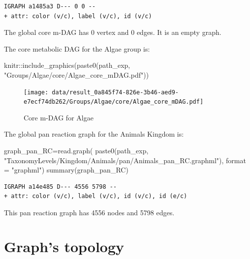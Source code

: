 \documentclass[
  letterpaper,
  DIV=11,
  numbers=noendperiod]{scrreprt}
\newenvironment{Shaded}{}{}
\newcommand{\AttributeTok}[1]{\textcolor[rgb]{0.78,0.47,0.87}{#1}}
\newcommand{\FunctionTok}[1]{\textcolor[rgb]{0.38,0.69,0.94}{#1}}
\newcommand{\NormalTok}[1]{\textcolor[rgb]{0.67,0.70,0.75}{#1}}
\newcommand{\OtherTok}[1]{\textcolor[rgb]{0.15,0.68,0.38}{#1}}
\newcommand{\SpecialCharTok}[1]{\textcolor[rgb]{0.34,0.71,0.76}{#1}}
\newcommand{\StringTok}[1]{\textcolor[rgb]{0.60,0.76,0.47}{#1}}
\begin{document}
\begin{verbatim}
IGRAPH a1485a3 D--- 0 0 -- 
+ attr: color (v/c), label (v/c), id (v/c)
\end{verbatim}

The global core m-DAG has 0 vertex and 0 edges. It is an empty graph.

The core metabolic DAG for the Algae group is:

\begin{Shaded}
\begin{Highlighting}[]
\NormalTok{knitr}\SpecialCharTok{::}\FunctionTok{include\_graphics}\NormalTok{(}\FunctionTok{paste0}\NormalTok{(path\_exp,                              }\StringTok{"Groups/Algae/core/Algae\_core\_mDAG.pdf"}\NormalTok{))}
\end{Highlighting}
\end{Shaded}

\begin{figure}[H]

{\centering \texttt{[image: data/result\_0a845f74-826e-3b46-aed9-e7ecf74db262/Groups/Algae/core/Algae\_core\_mDAG.pdf]}

}

\caption{Core m-DAG for Algae}

\end{figure}

The global pan reaction graph for the Animals Kingdom is:

\begin{Shaded}
\begin{Highlighting}[]
\NormalTok{graph\_pan\_RC}\OtherTok{=}\FunctionTok{read.graph}\NormalTok{(}
  \FunctionTok{paste0}\NormalTok{(path\_exp,}
         \StringTok{"TaxonomyLevels/Kingdom/Animals/pan/Animals\_pan\_RC.graphml"}\NormalTok{),}
  \AttributeTok{format =} \StringTok{"graphml"}\NormalTok{)}
\FunctionTok{summary}\NormalTok{(graph\_pan\_RC)}
\end{Highlighting}
\end{Shaded}

\begin{verbatim}
IGRAPH a14e485 D--- 4556 5798 -- 
+ attr: color (v/c), label (v/c), id (v/c), id (e/c)
\end{verbatim}

This pan reaction graph has 4556 nodes and 5798 edges.

\hypertarget{graphs-topology}{%
\section{Graph's topology}\label{graphs-topology}}
\end{document}
